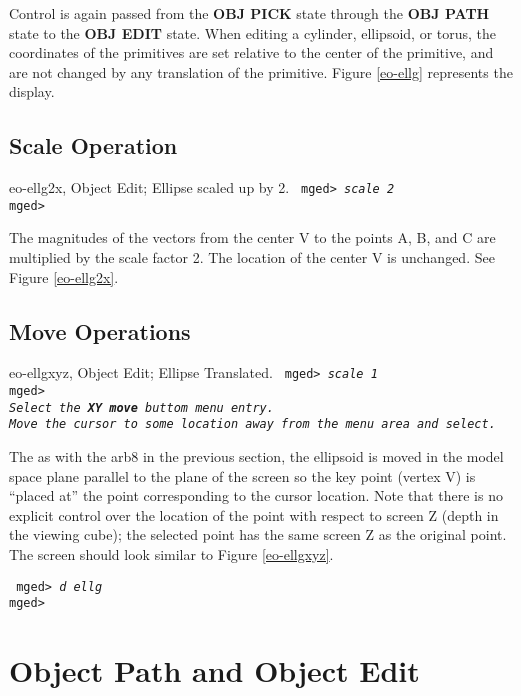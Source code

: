 Control is again passed from the {\bf OBJ PICK} state through the
{\bf OBJ PATH} state to the {\bf OBJ EDIT} state.
When editing a cylinder, ellipsoid, or torus, the coordinates of the
primitives are set relative to the center of the primitive, and are not
changed by any translation of the primitive.  Figure \ref{eo-ellg}
represents the display.

\subsection{Scale Operation}

\mfig eo-ellg2x, Object Edit; Ellipse scaled up by 2.
\noindent
{\tt
mged> {\em scale 2}\\
mged>\\
}

The magnitudes of the vectors from the center V to the points A, B, and C
are multiplied by the scale factor 2.  The location of the center V is
unchanged.  See Figure \ref{eo-ellg2x}.

\subsection{Move Operations}

\mfig eo-ellgxyz, Object Edit; Ellipse Translated.
\noindent
{\tt
mged> {\em scale 1}\\
mged>\\
{\em Select the {\bf XY move} buttom menu entry.}\\
{\em Move the cursor to some location away from the menu area and select.}\\
}

The as with the arb8 in the previous section, the ellipsoid is moved
in the model space plane parallel to the plane of the screen so the
key point (vertex V) is ``placed at'' the point corresponding to the
cursor location.  Note that there is no explicit control over the
location of the point with respect to screen Z (depth in the viewing
cube); the selected point has the same screen Z as the original point.
The screen should look similar to Figure \ref{eo-ellgxyz}.

\noindent
{\tt
mged> {\em d ellg}\\
mged>\\
}

\section{Object Path and Object Edit}

